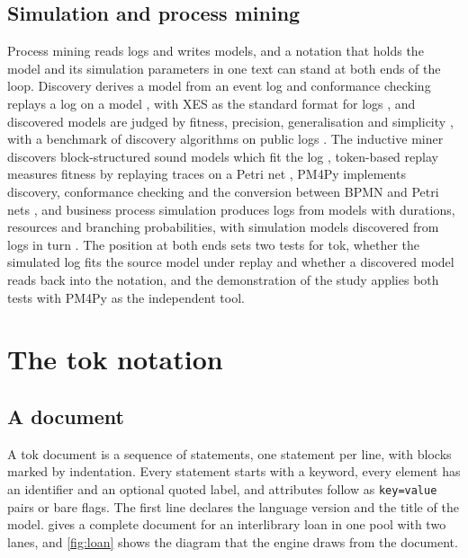 \documentclass[11pt,a4paper]{article}
\begin{document}
\subsection{Simulation and process mining}

Process mining reads logs and writes models, and a notation that holds the model and its simulation parameters in one text can stand at both ends of the loop. Discovery derives a model from an event log and conformance checking replays a log on a model \citep{vanderAalst2016}, with XES as the standard format for logs \citep{IEEE1849}, and discovered models are judged by fitness, precision, generalisation and simplicity \citep{Buijs2014quality}, with a benchmark of discovery algorithms on public logs \citep{Augusto2019discovery}. The inductive miner discovers block-structured sound models which fit the log \citep{Leemans2013}, token-based replay measures fitness by replaying traces on a Petri net \citep{Berti2021tbr}, PM4Py implements discovery, conformance checking and the conversion between BPMN and Petri nets \citep{Berti2023PM4Py}, and business process simulation produces logs from models with durations, resources and branching probabilities, with simulation models discovered from logs in turn \citep{ChapelaCampa2025simod}. The position at both ends sets two tests for tok, whether the simulated log fits the source model under replay and whether a discovered model reads back into the notation, and the demonstration of the study applies both tests with PM4Py as the independent tool.


\section{The tok notation}\label{sec:notation}

\subsection{A document}

A tok document is a sequence of statements, one statement per line, with blocks marked by indentation. Every statement starts with a keyword, every element has an identifier and an optional quoted label, and attributes follow as \texttt{key=value} pairs or bare flags. The first line declares the language version and the title of the model.  gives a complete document for an interlibrary loan in one pool with two lanes, and \cref{fig:loan} shows the diagram that the engine draws from the document.
\end{document}
